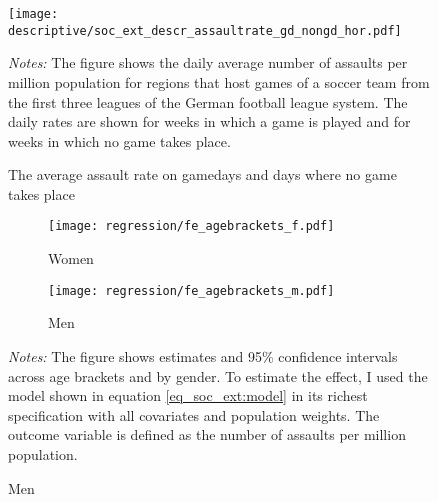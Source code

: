 \documentclass[11pt, a4paper]{article} %
\begin{document}
\vspace*{\fill}
\begin{figure}[H]\centering
	\caption{The average assault rate on gamedays and days where no game takes place}\label{fig_soc_ext:assault_rate_across_dows}
	\texttt{[image: descriptive/soc\_ext\_descr\_assaultrate\_gd\_nongd\_hor.pdf]}
	\begin{minipage}{0.95\linewidth}
		\scriptsize{\emph{Notes:} The figure shows the daily average number of assaults per million population for regions that host games of a soccer team from the first three leagues of the German football league system. The daily rates are shown for weeks in which a game is played and for weeks in which no game takes place.}
	\end{minipage}
\end{figure}
\vspace*{\fill}\clearpage

\begin{landscape}
	\vspace*{\fill}
	\begin{figure}[H]\centering
		\caption{The age profile of the impact of soccer matches on the assault rate}\label{fig_soc_ext:fe_age_profile}
		\begin{subfigure}[h]{0.48\linewidth}\centering\caption{Women}
			\texttt{[image: regression/fe\_agebrackets\_f.pdf]}
		\end{subfigure}
		\begin{subfigure}[h]{0.48\linewidth}\centering\caption{Men}
			\texttt{[image: regression/fe\_agebrackets\_m.pdf]}
		\end{subfigure}
		\scriptsize
		\begin{minipage}{\linewidth}
			\emph{Notes:} The figure shows estimates and 95\% confidence intervals across age brackets and by gender. To estimate the effect, I used the model shown in equation \ref{eq_soc_ext:model} in its richest specification with all covariates and population weights. The outcome variable is defined as the number of assaults per million population.
		\end{minipage}
	\end{figure}
	\vspace*{\fill}\clearpage
\end{landscape}
\end{document}
